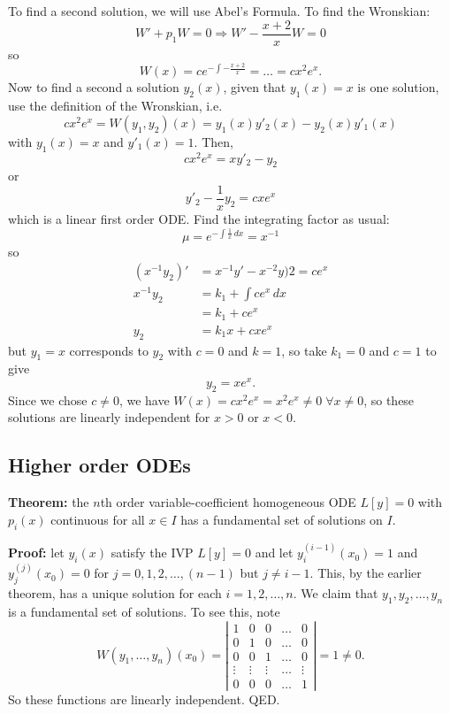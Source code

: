 \documentclass[11pt]{article}
\newcommand{\dx}{\,dx} %
\begin{document}
	To find a second solution, we will use Abel's Formula. To find the Wronskian:
		$$ W' + p_1 W = 0 \Rightarrow W' - \frac{x + 2}{x} W = 0 $$
	so
		$$ W(x) = c e^{- \int - \frac{x + 2}{x}} = \ldots = c x^2 e^x. $$
	Now to find a second a solution $y_2 (x)$, given that $y_1(x) = x$ is one solution, use the definition of the Wronskian, i.e.
		$$ c x^2 e^x = W(y_1, y_2)(x) = y_1 (x) y'_2 (x) - y_2 (x) y'_1(x) $$
	with $y_1(x) = x$ and $y'_1(x) = 1$. Then,
		$$ c x^2 e^x = x y'_2 - y_2 $$
	or
		$$ y'_2 - \frac{1}{x} y_2 = cxe^x $$
	which is a linear first order ODE. Find the integrating factor as usual:
		$$ \mu = e^{- \int \frac{1}{x}\dx} = x^{-1} $$
	so
		\begin{align*}
			(x^{-1} y_2)' &= x^{-1}y' - x^{-2}y)2 = ce^x \\
			x^{-1} y_2 &= k_1 + \int c e^x \dx \\
				&= k_1 + c e^x \\
			y_2 &= k_1 x + c x e^x
		\end{align*}
	but $y_1 = x$ corresponds to $y_2$ with $c=0$ and $k=1$, so take $k_1 = 0$ and $c=1$ to give
		$$ y_2 = xe^x. $$
	Since we chose $c \neq 0$, we have $W(x) = c x^2 e^x = x^2 e^x \neq 0 \; \forall x \neq 0$, so these solutions are linearly independent for $x > 0$ or $x < 0$.

\subsection{Higher order ODEs}
	\textbf{Theorem:} the $n$th order variable-coefficient homogeneous ODE $L[y]=0$ with $p_i(x)$ continuous for all $x \in I$ has a fundamental set of solutions on $I$.

	\textbf{Proof:} let $y_i(x)$ satisfy the IVP $L[y]=0$ and let $y^{(i-1)}_i (x_0) = 1$ and $y^{(j)}_j (x_0) = 0$ for $j = 0,1,2,\ldots,(n-1)$ but $j \neq i - 1$. This, by the earlier theorem, has a unique solution for each $i = 1, 2, \ldots, n$. We claim that $y_1, y_2, \ldots, y_n$ is a fundamental set of solutions. To see this, note
		$$ W(y_1, \ldots, y_n) (x_0) =
			\left|
				\begin{array}{ccccc}
					1 & 0 & 0 & \ldots & 0 \\
					0 & 1 & 0 & \ldots & 0 \\
					0 & 0 & 1 & \ldots & 0 \\
					\vdots & \vdots & \vdots & \ldots & \vdots \\
					0 & 0 & 0 & \ldots & 1
				\end{array}
			\right| = 1 \neq 0.
		$$
	So these functions are linearly independent. QED.
\end{document}

